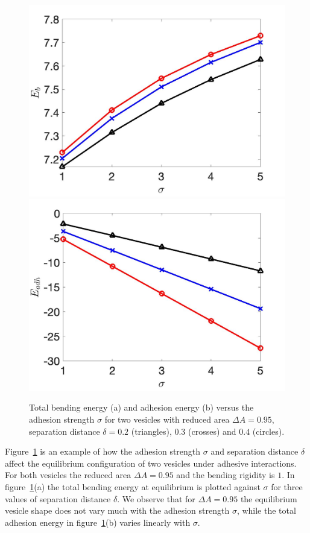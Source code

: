 \documentclass[%
preprint,
 amsmath,amssymb,
 aps,
]{revtex4-1}
\begin{document}
\begin{figure}
\includegraphics[keepaspectratio=true,scale=0.18]{figs/Dec18_Eb_vs_sigma_rA0p9502.jpeg}
\includegraphics[keepaspectratio=true,scale=0.18]{figs/Dec18_Eadh_vs_sigma_rA0p9502.jpeg}
\caption{Total bending energy (a) and adhesion energy (b) versus the adhesion strength $\sigma$ 
for two vesicles with reduced area $\Delta A=0.95$, separation distance $\delta = 0.2$ (triangles), $0.3$ (crosses)
and $0.4$ (circles). }
\label{fig:Dec18_equilibrium} 
\end{figure}
%
Figure~\ref{fig:Dec18_equilibrium} is an example of how the adhesion strength $\sigma$ and separation distance $\delta$ affect the equilibrium configuration of two vesicles under adhesive interactions.
For both vesicles the reduced area $\Delta A=0.95$ and the bending rigidity is $1$.
In figure~\ref{fig:Dec18_equilibrium}(a) 
the total bending energy at equilibrium is plotted against $\sigma$ for three values of separation distance $\delta$.
We observe that for $\Delta A=0.95$ the equilibrium vesicle shape does not vary much with the adhesion strength $\sigma$, while the total adhesion energy in figure~\ref{fig:Dec18_equilibrium}(b) varies linearly
with $\sigma$.
\end{document}
